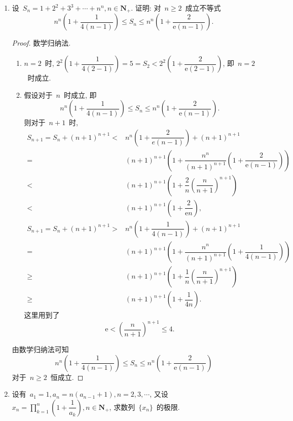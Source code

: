 \documentclass[UTF8,a4paper,11pt,twoside]{book}
\newcommand{\e}{\mathrm e}
\begin{document}
\begin{enumerate}
	\item 设~$S_n=1+2^2+3^3+\cdots+n^n, n\in\mathbf{N}_{+}$. 证明: 对~$n\geqslant 2$~成立不等式
	      \[
		      n^n\left(1+\dfrac{1}{4(n-1)}\right)\leqslant S_n\leqslant n^n\left(1+\dfrac{2}{\e(n-1)}\right).
	      \]
	      \begin{proof}
		      数学归纳法.
		      \begin{enumerate}[(1)]
			      \item $n=2$~时, $2^2\left(1+\dfrac{1}{4(2-1)}\right)=5=S_2<2^2\left(1+\dfrac{2}{\e(2-1)}\right)$, 即~$n=2$~时成立.
			      \item 假设对于~$n$~时成立, 即
			            \[
				            n^n\left(1+\dfrac{1}{4(n-1)}\right)\leqslant S_n\leqslant n^n\left(1+\dfrac{2}{\e(n-1)}\right).
			            \]
			            则对于~$n+1$~时,
			            \[
				            \begin{split}
					            S_{n+1}=S_n+(n+1)^{n+1}<&n^n\left(1+\dfrac{2}{e(n-1)}\right)+(n+1)^{n+1}\\
					            =&(n+1)^{n+1}\left(1+\dfrac{n^n}{(n+1)^{n+1}}\left(1+\dfrac{2}{\e(n-1)}\right)\right)\\
					            <&(n+1)^{n+1}\left(1+\dfrac{2}{n}\left(\dfrac{n}{n+1}\right)^{n+1}\right)\\
					            <&(n+1)^{n+1}\left(1+\dfrac{2}{\e n}\right),\\
					            S_{n+1}=S_n+(n+1)^{n+1}>&n^n\left(1+\dfrac{1}{4(n-1)}\right)+(n+1)^{n+1}\\
					            =&(n+1)^{n+1}\left(1+\dfrac{n^n}{(n+1)^{n+1}}\left(1+\dfrac{1}{4(n-1)}\right)\right)\\
					            \geqslant&(n+1)^{n+1}\left(1+\dfrac{1}{n}\left(\dfrac{n}{n+1}\right)^{n+1}\right)\\
					            \geqslant&(n+1)^{n+1}\left(1+\dfrac{1}{4n}\right).
				            \end{split}
			            \]
			            这里用到了
			            \[
				            \e<\left(\dfrac{n}{n+1}\right)^{n+1}\leqslant 4.
			            \]
		      \end{enumerate}
		      由数学归纳法可知
		      \[
			      n^n\left(1+\dfrac{1}{4(n-1)}\right)\leqslant S_n\leqslant n^n\left(1+\dfrac{2}{\e(n-1)}\right)
		      \]
		      对于~$n\geqslant 2$~恒成立.\qedhere
	      \end{proof}
	\item 设有~$a_1=1,a_n=n(a_{n-1}+1), n=2,3,\cdots$, 又设~$x_n=\prod\limits_{k=1}^n\left(1+\dfrac{1}{a_k}\right), n\in\mathbf{N}_{+}$, 求数列~$\{x_n\}$~的极限.

\end{enumerate}
\end{document}
